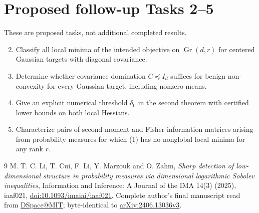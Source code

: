 \documentclass[11pt]{article}
\newcommand{\Gr}{\operatorname{Gr}}
\begin{document}
\section*{Proposed follow-up Tasks 2--5}
These are proposed tasks, not additional completed results.
\begin{enumerate}
\setcounter{enumi}{1}
\item Classify all local minima of the intended objective on
$\Gr(d,r)$ for centered Gaussian targets with diagonal covariance.
\item Determine whether covariance domination $C\preceq I_d$ suffices
for benign non-convexity for every Gaussian target, including nonzero means.
\item Give an explicit numerical threshold $\delta_0$ in the second
theorem with certified lower bounds on both local Hessians.
\item Characterize pairs of second-moment and Fisher-information
matrices arising from probability measures for which (1) has no nonglobal
local minima for any rank $r$.
\end{enumerate}

\begin{thebibliography}{9}
 M. T. C. Li, T. Cui, F. Li, Y. Marzouk and O. Zahm,
\emph{Sharp detection of low-dimensional structure in probability
measures via dimensional logarithmic Sobolev inequalities},
Information and Inference: A Journal of the IMA 14(3) (2025), iaaf021,
\href{https://doi.org/10.1093/imaiai/iaaf021}{doi:10.1093/imaiai/iaaf021}.
Complete author's final manuscript read from
\href{https://dspace.mit.edu/handle/1721.1/167023}{DSpace@MIT};
byte-identical to \href{https://arxiv.org/abs/2406.13036v3}{arXiv:2406.13036v3}.
\end{thebibliography}
\end{document}
